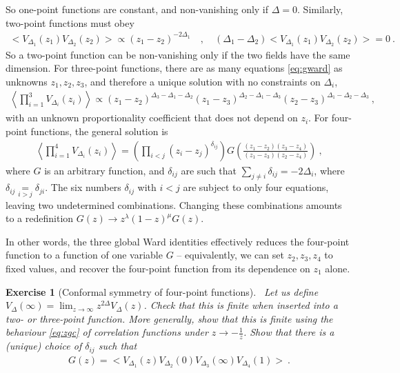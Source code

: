 \documentclass[12pt, a4paper]{article}
\theoremstyle{break}
\newtheorem{exo}{Exercise}[section]
\begin{document}
So one-point functions are constant, and non-vanishing only if $\Delta=0$. Similarly, two-point functions must obey
\begin{align}
 \Big< V_{\Delta_1}(z_1)V_{\Delta_2}(z_2) \Big> \propto (z_1-z_2)^{-2\Delta_1} \quad , \quad (\Delta_1-\Delta_2)\Big< V_{\Delta_1}(z_1)V_{\Delta_2}(z_2) \Big>  = 0\ .
 \label{eq:2pt}
\end{align}
So a two-point function can be non-vanishing only if the two fields have the same dimension.
For three-point functions, there are as many equations \eqref{eq:gward} as unknowns $z_1,z_2,z_3$, and therefore a unique solution with no constraints on $\Delta_i$,
\begin{align}
 \left< \prod_{i=1}^3 V_{\Delta_i}(z_i) \right> \propto (z_1-z_2)^{\Delta_3-\Delta_1-\Delta_2} (z_1-z_3)^{\Delta_2-\Delta_1-\Delta_3} (z_2-z_3)^{\Delta_1-\Delta_2-\Delta_3}\ ,
 \label{eq:3pt}
\end{align}
with an unknown proportionality coefficient that does not depend on $z_i$.
For four-point functions, the general solution is
\begin{align}
 \left< \prod_{i=1}^4 V_{\Delta_i}(z_i) \right> = \left(\prod_{i<j}(z_i-z_j)^{\delta_{ij}}\right) G\left(\frac{(z_1-z_2)(z_3-z_4)}{(z_1-z_3)(z_2-z_4)}\right)\ ,
\end{align}
where $G$ is an arbitrary function, and $\delta_{ij}$ are such that $\sum_{j\neq i} \delta_{ij} = -2\Delta_i$, where $\delta_{ij}\underset{i>j}{=}\delta_{ji}$. The six numbers $\delta_{ij}$ with $i<j$ are subject to only four equations, leaving two undetermined combinations. Changing these combinations amounts to a redefinition $G(z)\to z^\lambda (1-z)^\mu G(z)$.

In other words, the three global Ward identities effectively reduces the four-point function to a function of one variable $G$ -- equivalently, we can set $z_2,z_3,z_4$ to fixed values, and recover the four-point function from its dependence on $z_1$ alone. 

\begin{exo}[Conformal symmetry of four-point functions]
~\label{exo:4pt}
 Let us define $V_\Delta(\infty) = \lim_{z\to\infty} z^{2\Delta}V_\Delta(z) $. Check that this is finite when inserted into a two- or three-point function. More generally, show that this is finite using the behaviour \eqref{eq:zgc} of correlation functions under $z\to -\frac{1}{z}$. 
 Show that there is a (unique) choice of $\delta_{ij}$ such that 
 \begin{align}
  G(z) = \Big< V_{\Delta_1}(z) V_{\Delta_2}(0)V_{\Delta_3}(\infty)V_{\Delta_4}(1) \Big>\ .
 \end{align}
\end{exo}
\end{document}
